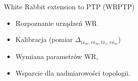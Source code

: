 \documentclass[compress,red]{beamer}
\begin{document}
\begin{frame}{White Rabbit extension to PTP (WRPTP)}

  \begin{itemize}
    \item Rozpoznanie urządzeń WR
    \item Kalibracja (pomiar $\Delta_{tx_m, rx_m, tx_s, rx_m}$)
    \item Wymiana parametrów WR,
    \item Wsparcie dla nadmiarowości topologii.
  \end{itemize}

\end{frame}
% 
% 
\end{document}
